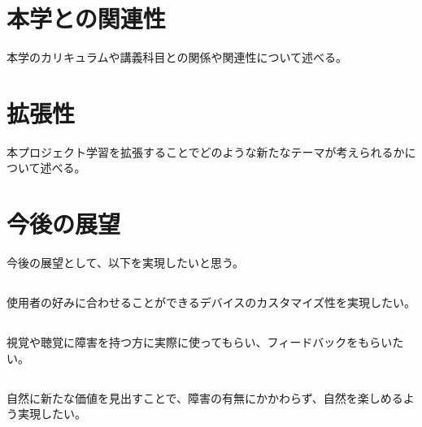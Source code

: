 \section{本学との関連性}
本学のカリキュラムや講義科目との関係や関連性について述べる。

\section{拡張性}
本プロジェクト学習を拡張することでどのような新たなテーマが考えられるかについて述べる。

\section{今後の展望}今後の展望として、以下を実現したいと思う。
\subsection{}使用者の好みに合わせることができるデバイスのカスタマイズ性を実現したい。
\subsection{}視覚や聴覚に障害を持つ方に実際に使ってもらい、フィードバックをもらいたい。
\subsection{}自然に新たな価値を見出すことで、障害の有無にかかわらず、自然を楽しめるよう実現したい。

\newpage\clearpage
\vspace*{-20pt}
\printbibliography[segment=\therefsegment,heading=subbibliography]
